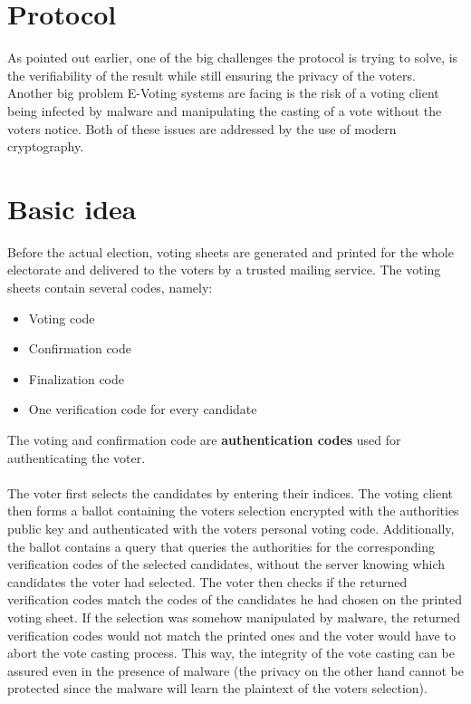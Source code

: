 \documentclass[a4paper,12pt]{report}
\theoremstyle{definition}
\begin{document}
\section{Protocol}
As pointed out earlier, one of the big challenges the protocol is trying to solve, is the verifiability of the result while still ensuring the privacy of the voters. Another big problem E-Voting systems are facing is the risk of a voting client being infected by malware and manipulating the casting of a vote without the voters notice. Both of these issues are addressed by the use of modern cryptography.
\section{Basic idea}
Before the actual election, voting sheets are generated and printed for the whole electorate and delivered to the voters by a trusted mailing service. The voting sheets contain several codes, namely:
\begin{itemize}
	\item Voting code
	\item Confirmation code
	\item Finalization code
	\item One verification code for every candidate
\end{itemize}
The voting and confirmation code are \textbf{authentication codes} used for authenticating the voter.\\\\
The voter first selects the candidates by entering their indices. The voting client then forms a ballot containing the voters selection encrypted with the authorities public key and authenticated with the voters personal voting code. Additionally, the ballot contains a query that queries the authorities for the corresponding verification codes of the selected candidates, without the server knowing which candidates the voter had selected. The voter then checks if the returned verification codes match the codes of the candidates he had chosen on the printed voting sheet. If the selection was somehow manipulated by malware, the returned verification codes would not match the printed ones and the voter would have to abort the vote casting process. This way, the integrity of the vote casting can be assured even in the presence of malware (the privacy on the other hand cannot be protected since the malware will learn the plaintext of the voters selection).
\end{document}
